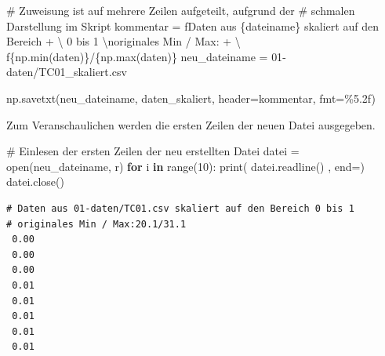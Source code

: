 \documentclass[
  letterpaper,
  DIV=11,
  numbers=noendperiod]{scrreprt}
\newenvironment{Shaded}{\begin{snugshade}}{\end{snugshade}}
\newcommand{\BuiltInTok}[1]{\textcolor[rgb]{0.00,0.23,0.31}{#1}}
\newcommand{\CharTok}[1]{\textcolor[rgb]{0.13,0.47,0.30}{#1}}
\newcommand{\CommentTok}[1]{\textcolor[rgb]{0.37,0.37,0.37}{#1}}
\newcommand{\ControlFlowTok}[1]{\textcolor[rgb]{0.00,0.23,0.31}{\textbf{#1}}}
\newcommand{\DecValTok}[1]{\textcolor[rgb]{0.68,0.00,0.00}{#1}}
\newcommand{\KeywordTok}[1]{\textcolor[rgb]{0.00,0.23,0.31}{\textbf{#1}}}
\newcommand{\NormalTok}[1]{\textcolor[rgb]{0.00,0.23,0.31}{#1}}
\newcommand{\OperatorTok}[1]{\textcolor[rgb]{0.37,0.37,0.37}{#1}}
\newcommand{\SpecialCharTok}[1]{\textcolor[rgb]{0.37,0.37,0.37}{#1}}
\newcommand{\SpecialStringTok}[1]{\textcolor[rgb]{0.13,0.47,0.30}{#1}}
\newcommand{\StringTok}[1]{\textcolor[rgb]{0.13,0.47,0.30}{#1}}
\begin{document}
\begin{Shaded}
\begin{Highlighting}[]
\CommentTok{\# Zuweisung ist auf mehrere Zeilen aufgeteilt, aufgrund der }
\CommentTok{\# schmalen Darstellung im Skript}
\NormalTok{kommentar }\OperatorTok{=} \SpecialStringTok{f\textquotesingle{}Daten aus }\SpecialCharTok{\{}\NormalTok{dateiname}\SpecialCharTok{\}}\SpecialStringTok{ skaliert auf den Bereich \textquotesingle{}} \OperatorTok{+} \OperatorTok{\textbackslash{}}
             \StringTok{\textquotesingle{}0 bis 1 }\CharTok{\textbackslash{}n}\StringTok{originales Min / Max:\textquotesingle{}} \OperatorTok{+} \OperatorTok{\textbackslash{}}
            \SpecialStringTok{f\textquotesingle{}}\SpecialCharTok{\{}\NormalTok{np}\SpecialCharTok{.}\BuiltInTok{min}\NormalTok{(daten)}\SpecialCharTok{\}}\SpecialStringTok{/}\SpecialCharTok{\{}\NormalTok{np}\SpecialCharTok{.}\BuiltInTok{max}\NormalTok{(daten)}\SpecialCharTok{\}}\SpecialStringTok{\textquotesingle{}}
\NormalTok{neu\_dateiname }\OperatorTok{=} \StringTok{\textquotesingle{}01{-}daten/TC01\_skaliert.csv\textquotesingle{}}

\NormalTok{np.savetxt(neu\_dateiname, daten\_skaliert, }
\NormalTok{           header}\OperatorTok{=}\NormalTok{kommentar, fmt}\OperatorTok{=}\StringTok{\textquotesingle{}}\SpecialCharTok{\%5.2f}\StringTok{\textquotesingle{}}\NormalTok{)}
\end{Highlighting}
\end{Shaded}

Zum Veranschaulichen werden die ersten Zeilen der neuen Datei
ausgegeben.

\begin{Shaded}
\begin{Highlighting}[]
\CommentTok{\# Einlesen der ersten Zeilen der neu erstellten Datei}
\NormalTok{datei }\OperatorTok{=} \BuiltInTok{open}\NormalTok{(neu\_dateiname, }\StringTok{\textquotesingle{}r\textquotesingle{}}\NormalTok{)}
\ControlFlowTok{for}\NormalTok{ i }\KeywordTok{in} \BuiltInTok{range}\NormalTok{(}\DecValTok{10}\NormalTok{):}
    \BuiltInTok{print}\NormalTok{( datei.readline() , end}\OperatorTok{=}\StringTok{\textquotesingle{}\textquotesingle{}}\NormalTok{)}
\NormalTok{datei.close()}
\end{Highlighting}
\end{Shaded}

\begin{verbatim}
# Daten aus 01-daten/TC01.csv skaliert auf den Bereich 0 bis 1 
# originales Min / Max:20.1/31.1
 0.00
 0.00
 0.00
 0.01
 0.01
 0.01
 0.01
 0.01
\end{verbatim}
\end{document}
